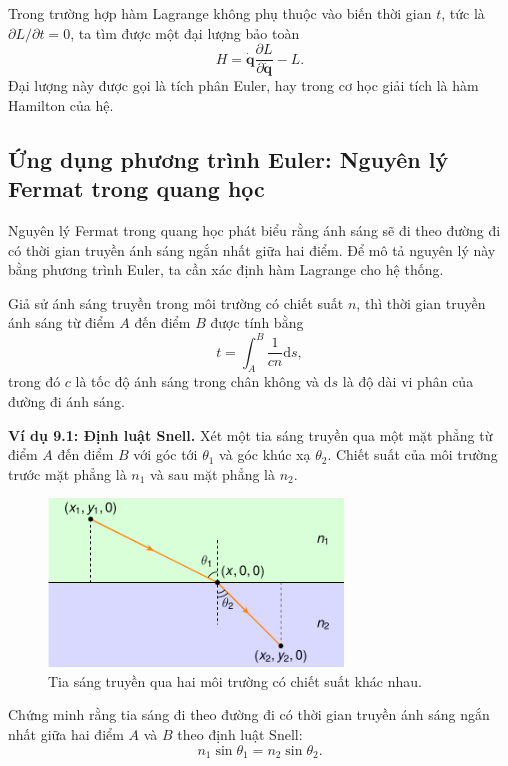 Trong trường hợp hàm Lagrange không phụ thuộc vào biến thời gian \(t\), tức là \(\partial L/\partial t = 0\), ta tìm được một đại lượng bảo toàn
\begin{equation}
    H = \mathbf{\dot{q}} \dfrac{\partial L}{\partial \mathbf{\dot{q}}} - L.
\end{equation}
Đại lượng này được gọi là tích phân Euler, hay trong cơ học giải tích là hàm Hamilton của hệ.

\subsection{Ứng dụng phương trình Euler: Nguyên lý Fermat trong quang học}

Nguyên lý Fermat trong quang học phát biểu rằng ánh sáng sẽ đi theo đường đi có thời gian truyền ánh sáng ngắn nhất giữa hai điểm. Để mô tả nguyên lý này bằng phương trình Euler, ta cần xác định hàm Lagrange cho hệ thống.

Giả sử ánh sáng truyền trong môi trường có chiết suất \(n\), thì thời gian truyền ánh sáng từ điểm \(A\) đến điểm \(B\) được tính bằng
\begin{equation}
    t = \int_{A}^{B} \frac{1}{c n}\mathrm{d}s,
\end{equation}
trong đó \(c\) là tốc độ ánh sáng trong chân không và \(\mathrm{d}s\) là độ dài vi phân của đường đi ánh sáng.

\textbf{Ví dụ 9.1: Định luật Snell.} Xét một tia sáng truyền qua một mặt phẳng từ điểm \(A\) đến điểm \(B\) với góc tới \(\theta_1\) và góc khúc xạ \(\theta_2\). Chiết suất của môi trường trước mặt phẳng là \(n_1\) và sau mặt phẳng là \(n_2\). 

\begin{figure}[!h]
    \centering
    \includegraphics[width=0.7\textwidth]{Tuan9/Figures/Snellius_law.pdf}
    \caption{Tia sáng truyền qua hai môi trường có chiết suất khác nhau.}
    \label{fig:Snell_law}
\end{figure}
Chứng minh rằng tia sáng đi theo đường đi có thời gian truyền ánh sáng ngắn nhất giữa hai điểm \(A\) và \(B\) theo định luật Snell:
\begin{equation}
    n_1 \sin \theta_1 = n_2 \sin \theta_2.
\end{equation}

